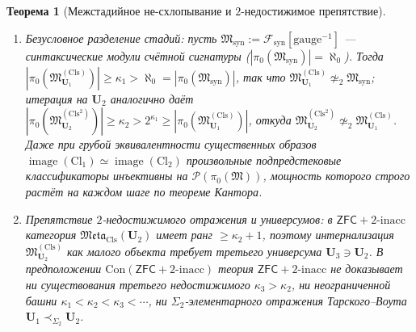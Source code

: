 \documentclass[11pt]{article}
\theoremstyle{plain}
\newtheorem{theorem}{Теорема}[section]
\theoremstyle{definition}
\newcommand{\cF}{\mathcal{F}}
\newcommand{\fM}{\mathfrak{M}}
\newcommand{\Meta}{\mathfrak{Meta}}
\newcommand{\Cl}{\mathrm{Cl}}
\newcommand{\Con}{\mathrm{Con}}
\newcommand{\ZFC}{\mathsf{ZFC}}
\DeclareMathOperator{\image}{image}
\begin{document}
\begin{theorem}[Межстадийное не-схлопывание и $2$-недостижимое препятствие]\label{thm:meta-nonidempotence-obstruction}
\begin{enumerate}[nosep,label=(\roman*)]
\item \emph{Безусловное разделение стадий}: пусть $\fM_{\mathrm{syn}} := \cF_{\mathrm{syn}}[\mathrm{gauge}^{-1}]$ — синтаксические модули счётной сигнатуры ($|\pi_0(\fM_{\mathrm{syn}})| = \aleph_0$). Тогда $|\pi_0(\fM^{(\mathrm{Cls})}_{\mathbf{U}_1})| \ge \kappa_1 > \aleph_0 = |\pi_0(\fM_{\mathrm{syn}})|$, так что $\fM^{(\mathrm{Cls})}_{\mathbf{U}_1} \not\simeq_2 \fM_{\mathrm{syn}}$; итерация на $\mathbf{U}_2$ аналогично даёт $|\pi_0(\fM^{(\mathrm{Cls}^2)}_{\mathbf{U}_2})| \ge \kappa_2 > 2^{\kappa_1} \ge |\pi_0(\fM^{(\mathrm{Cls})}_{\mathbf{U}_1})|$, откуда $\fM^{(\mathrm{Cls}^2)}_{\mathbf{U}_2} \not\simeq_2 \fM^{(\mathrm{Cls})}_{\mathbf{U}_1}$. Даже при грубой эквивалентности существенных образов $\image(\Cl_1) \simeq \image(\Cl_2)$ произвольные подпредстековые классификаторы инъективны на $\mathcal{P}(\pi_0(\fM))$, мощность которого строго растёт на каждом шаге по теореме Кантора.
\item \emph{Препятствие $2$-недостижимого отражения и универсумов}: в $\ZFC + 2\text{-inacc}$ категория $\Meta_{\mathrm{Cls}}(\mathbf{U}_2)$ имеет ранг $\ge \kappa_2 + 1$, поэтому интернализация $\fM^{(\mathrm{Cls})}_{\mathbf{U}_2}$ как малого объекта требует третьего универсума $\mathbf{U}_3 \ni \mathbf{U}_2$. В предположении $\Con(\ZFC + 2\text{-inacc})$ теория $\ZFC + 2\text{-inacc}$ не доказывает ни существования третьего недостижимого $\kappa_3 > \kappa_2$, ни неограниченной башни $\kappa_1 < \kappa_2 < \kappa_3 < \cdots$, ни $\Sigma_2$-элементарного отражения Тарского--Воута $\mathbf{U}_1 \prec_{\Sigma_2} \mathbf{U}_2$.
\end{enumerate}
\end{theorem}
\end{document}
